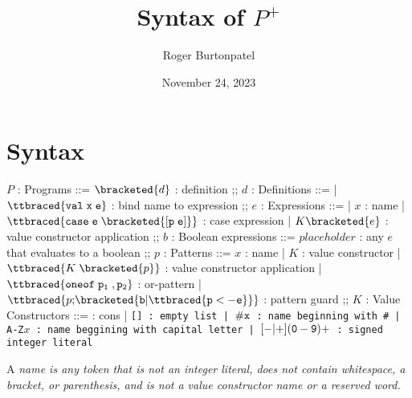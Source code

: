 \documentclass[]{article}
\title{Syntax of $P^{+}$}
\author{Roger Burtonpatel}
\date{November 24, 2023}
\begin{document}
\maketitle

\newcommand\la{\langle}
\newcommand\ra{\rangle}
\def\<#1>{\synt{#1}}

\newcommand\B[1]{\synt{#1}}

\section{Syntax}

\bigskip 
\begin{center}
    \begin{bnf}

    $P$ : \textsf{Programs} ::=
    $\bracketed{d}$ : definition
    ;;
    $d$ : \textsf{Definitions} ::=
    | $\ttbraced{\tt{val} \; x \; e}$ : bind name to expression
    ;;
    $e$ : \textsf{Expressions} ::=
    | $x$ : name
    | $\ttbraced{\tt{case} \; e \; \bracketed{\tt{[} p \; e \tt{]}}}$ : case expression 
    | $K \bracketed{e}$ : value constructor application 
    ;;
    $b$ : Boolean expressions ::=
     $\mathit{placeholder}$ : any $e$ that evaluates to a boolean 
    ;;
    $p$ : \textsf{Patterns} ::= $x$ : name 
    | $K$ : value constructor 
    | $\ttbraced{K \; \bracketed{p}}$ : value constructor application 
    | $\ttbraced{\tt{oneof} \; p_{1} \;, p_{2} }$ : or-pattern 
    | $\ttbraced{p \tt{;} \bracketed{b \vert \ttbraced{p  <- e}}}$ : pattern guard
    ;;
    $K$ : \textsf{Value Constructors} ::=
    \cons : cons 
    | \tt{[]} : empty list 
    | $\tt{\#}x$ : name beginning with \tt{\#}
    | \tt{A-Z}$x$ : name beggining with capital letter
    | $[\tt{-}\vert\tt{+}](\tt{0}-\tt{9})+$ : signed integer literal 

    \end{bnf}
\end{center}
\bigskip 

A \it{name} is any token that is not an integer literal, 
does not contain whitespace, a bracket, or parenthesis, 
and is not a value constructor name or a reserved word.

\bigskip

\end{document}
